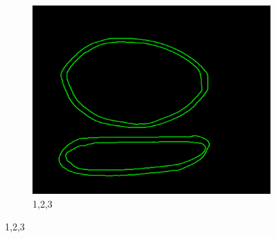 \documentclass[11pt]{article}
\begin{document}
\begin{figure}[H]
\begin{subfigure}[t]{0.32\textwidth}
		\includegraphics[scale=0.28]{pics/elimination/joinedAfterRemoval3.png}
		\caption{1,2,3}
		\label{construction3}
	\end{subfigure}
	

\end{figure}
\end{document}
